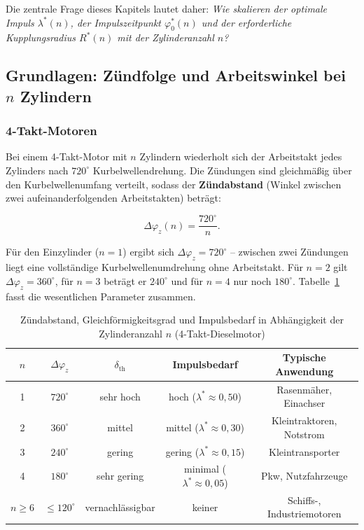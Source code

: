 ﻿\documentclass[a4paper,12pt]{article}
\begin{document}
Die zentrale Frage dieses Kapitels lautet daher: \textit{Wie skalieren der
optimale Impuls $\lambda^*(n)$, der Impulszeitpunkt $\varphi_0^*(n)$ und der
erforderliche Kupplungsradius $R^*(n)$ mit der Zylinderanzahl $n$?}

\subsection{Grundlagen: Zündfolge und Arbeitswinkel bei $n$ Zylindern}

\subsubsection*{4-Takt-Motoren}

Bei einem 4-Takt-Motor mit $n$ Zylindern wiederholt sich der Arbeitstakt
jedes Zylinders nach $720^\circ$ Kurbelwellendrehung. Die Zündungen sind
gleichmäßig über den Kurbelwellenumfang verteilt, sodass der
\textbf{Zündabstand} (Winkel zwischen zwei aufeinanderfolgenden Arbeitstakten)
beträgt:

\begin{equation}
  \Delta\varphi_z(n) = \frac{720^\circ}{n}.
  \label{eq:zuendabstand}
\end{equation}

Für den Einzylinder ($n=1$) ergibt sich $\Delta\varphi_z = 720^\circ$ --
zwischen zwei Zündungen liegt eine vollständige Kurbelwellenumdrehung ohne
Arbeitstakt. Für $n=2$ gilt $\Delta\varphi_z = 360^\circ$, für $n=3$
beträgt er $240^\circ$ und für $n=4$ nur noch $180^\circ$. Tabelle~\ref{tab:nzyl}
fasst die wesentlichen Parameter zusammen.

\begin{table}[h]
\centering
\caption{Zündabstand, Gleichförmigkeitsgrad und Impulsbedarf in Abhängigkeit
der Zylinderanzahl $n$ (4-Takt-Dieselmotor)}
\label{tab:nzyl}
\begin{tabular}{ccccc}
\toprule
$n$ & $\Delta\varphi_z$ & $\delta_\text{th}$ & Impulsbedarf & Typische Anwendung \\
\midrule
1 & $720^\circ$ & sehr hoch  & hoch ($\lambda^* \approx 0{,}50$) & Rasenmäher, Einachser \\
2 & $360^\circ$ & mittel     & mittel ($\lambda^* \approx 0{,}30$) & Kleintraktoren, Notstrom \\
3 & $240^\circ$ & gering     & gering ($\lambda^* \approx 0{,}15$) & Kleintransporter \\
4 & $180^\circ$ & sehr gering & minimal ($\lambda^* \approx 0{,}05$) & Pkw, Nutzfahrzeuge \\
$n \geq 6$ & $\leq 120^\circ$ & vernachlässigbar & keiner & Schiffs-, Industriemotoren \\
\bottomrule
\end{tabular}
\end{table}
\end{document}
